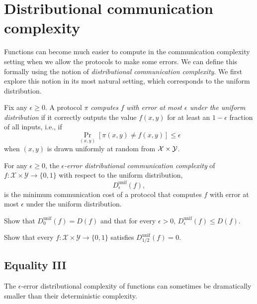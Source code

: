 \chapter[CH03]{Distributional communication complexity}

Functions can become much easier to compute in the communication complexity setting when we allow the protocols to make some errors. We can define this formally using the notion of \emph{distributional communication complexity}. We first explore this notion in its most natural setting, which corresponds to the uniform distribution.
\newpage
\begin{definition}
	Fix any $\epsilon \ge 0$. A protocol $\pi$ \emph{computes} $f$ \emph{with error at most $\epsilon$ under the uniform distribution} if it correctly outputs the value $f(x,y)$ for at least an $1-\epsilon$ fraction of all inputs, i.e., if
	\[
	\Pr_{(x,y)}[ \pi(x,y) \neq f(x,y)] \le \epsilon
	\]
	when $(x,y)$ is drawn uniformly at random from $\mathcal{X} \times \mathcal{Y}$.
\end{definition}

\begin{definition}
	For any $\epsilon \ge 0$, the \emph{$\epsilon$-error distributional communication complexity} of $f : \mathcal{X} \times \mathcal{Y} \to \{0,1\}$ with respect to the uniform distribution,
	\[
	D_\epsilon^{\mathrm{unif}}(f),
	\]
	is the minimum communication cost of a protocol that computes $f$ with error at most $\epsilon$ under the uniform distribution.
\end{definition}

\exercises

\begin{exercise}
	Show that $D_0^{\mathrm{unif}}(f) = D(f)$ and that for every $\epsilon > 0$, 
	$D_\epsilon^{\mathrm{unif}}(f) \le D(f)$.
\end{exercise}

\begin{exercise}
	Show that every $f : \mathcal{X} \times \mathcal{Y} \to \{0,1\}$ satisfies
	$D_{1/2}^{\mathrm{unif}}(f) = 0$.
\end{exercise}


\section{Equality III}

The $\epsilon$-error distributional complexity of functions can sometimes be dramatically smaller than their deterministic complexity.

